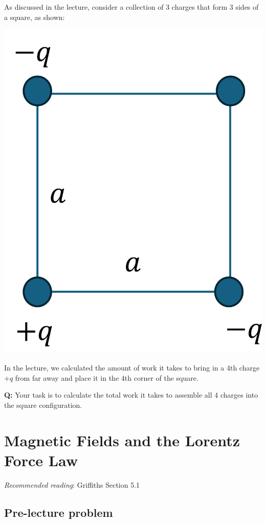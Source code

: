 \documentclass[
  letterpaper,
  DIV=11,
  numbers=noendperiod]{scrreprt}
\begin{document}
As discussed in the lecture, consider a collection of 3 charges that
form 3 sides of a square, as shown:

\includegraphics{Figures/L3_3charges.png}

In the lecture, we calculated the amount of work it takes to bring in a
4th charge \(+q\) from far away and place it in the 4th corner of the
square.

\textbf{Q:} Your task is to calculate the total work it takes to
assemble all 4 charges into the square configuration.


\chapter{Magnetic Fields and the Lorentz Force
Law}\label{magnetic-fields-and-the-lorentz-force-law}

\emph{Recommended reading}: Griffiths Section 5.1

\section{Pre-lecture problem}\label{pre-lecture-problem-2}
\end{document}
